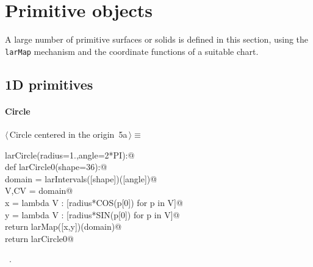 \documentclass[11pt,oneside]{article}	%
\begin{document}
\section{Primitive objects}
\label{sec:generators}

A large number of primitive surfaces or solids is defined in this section, using the \texttt{larMap} mechanism and the coordinate functions of a suitable chart.

\subsection{1D primitives}

\paragraph{Circle}
\begin{flushleft} \small \label{scrap6}
\protect{}$\langle\,$Circle centered in the origin\nobreak\ {\footnotesize 5a}$\,\rangle\equiv$
\vspace{-1ex}
\begin{list}{}{} \item
\mbox{}\verb@def larCircle(radius=1.,angle=2*PI):@\\
\mbox{}\verb@   def larCircle0(shape=36):@\\
\mbox{}\verb@      domain = larIntervals([shape])([angle])@\\
\mbox{}\verb@      V,CV = domain@\\
\mbox{}\verb@      x = lambda V : [radius*COS(p[0]) for p in V]@\\
\mbox{}\verb@      y = lambda V : [radius*SIN(p[0]) for p in V]@\\
\mbox{}\verb@      return larMap([x,y])(domain)@\\
\mbox{}\verb@   return larCircle0@\\
\mbox{}\verb@@{\NWsep}
\end{list}
\vspace{-1ex}
\footnotesize\addtolength{\baselineskip}{-1ex}
\begin{list}{}{\setlength{\itemsep}{-\parsep}\setlength{\itemindent}{-\leftmargin}}
\item \NWtxtMacroRefIn\ .
\end{list}
\end{flushleft}
\end{document}
